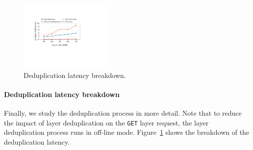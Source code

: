 \begin{figure}[t]
	\centering
	\includegraphics[width=0.4\textwidth]{graphs/dedupbreakdown.pdf}
	\caption{Deduplication latency breakdown.}
	\label{fig:eval-dedupbreakdown}
\end{figure}

\paragraph{Deduplication latency breakdown}
%
Finally, we study the deduplication process in more detail.
%
Note that to reduce the impact of layer deduplication on the \texttt{GET} layer request,
the layer deduplication process runs in off-line mode.
%
Figure~\ref{fig:eval-dedupbreakdown} shows the breakdown of the deduplication latency.

